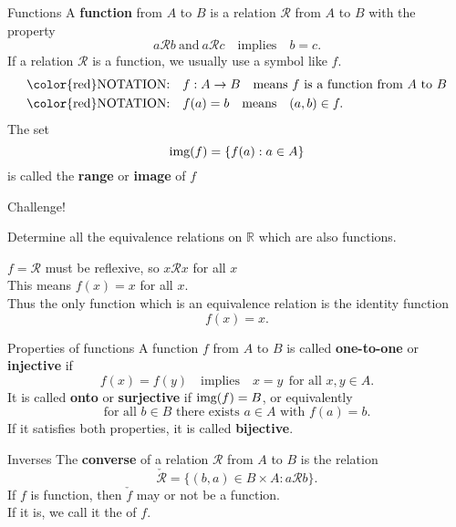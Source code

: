 \documentclass{beamer}
\begin{document}
\begin{frame}{Functions}
A \textbf{function} from $A$ to $B$ is a relation $\mathcal R$ from $A$ to $B$ with the property
\pause
$$a\mathcal Rb\ \text{and}\ a\mathcal Rc\quad\text{implies}\quad b=c.$$
\pause
If a relation $\mathcal R$ is a function, we usually use a symbol like $f$.\\
\pause
\begin{align*}
\text{\color{red}NOTATION:}&\quad f: A\rightarrow B\quad\text{means $f$ is a function from $A$ to $B$}\\
\text{\color{red}NOTATION:}&\quad f(a) = b\quad\text{means}\quad (a,b)\in f.
\end{align*}
\pause
The set $$\textnormal{img}(f) = \{f(a): a\in A\}$$ is called the \textbf{range} or \textbf{image} of $f$
\end{frame}

\begin{frame}{Challenge!}
\begin{prob}
Determine all the equivalence relations on $\mathbb{R}$ which are also functions.
\end{prob}
\pause
\begin{soln}
$f=\mathcal R$ must be reflexive, so $x\mathcal Rx$ for all $x$\\
\pause
This means $f(x) = x$ for all $x$.\\
\pause
Thus the only function which is an equivalence relation is the identity function
$$f(x) = x.$$
\end{soln}
\end{frame}

\begin{frame}{Properties of functions}
A function $f$ from $A$ to $B$ is called \textbf{one-to-one} or \textbf{injective} if 
\pause
$$f(x) = f(y) \quad\text{implies}\quad x=y\ \ \text{for all $x,y\in A$}.$$
\pause
It is called \textbf{onto} or \textbf{surjective} if $\textnormal{img}(f) = B$, or equivalently
$$\text{for all $b\in B$ there exists $a\in A$ with $f(a) =b$}.$$
\pause
If it satisfies both properties, it is called \textbf{bijective}.
\end{frame}

\begin{frame}{Inverses}
The \textbf{converse} of a relation $\mathcal R$ from $A$ to $B$ is the relation
\pause
$$\check{\mathcal R} = \{(b,a)\in B\times A: a\mathcal R b\}.$$
\pause
If $f$ is  function, then $\check f$ may or not be a function.\\
\pause
If it is, we call it the  of $f$.
\end{frame}
\end{document}
